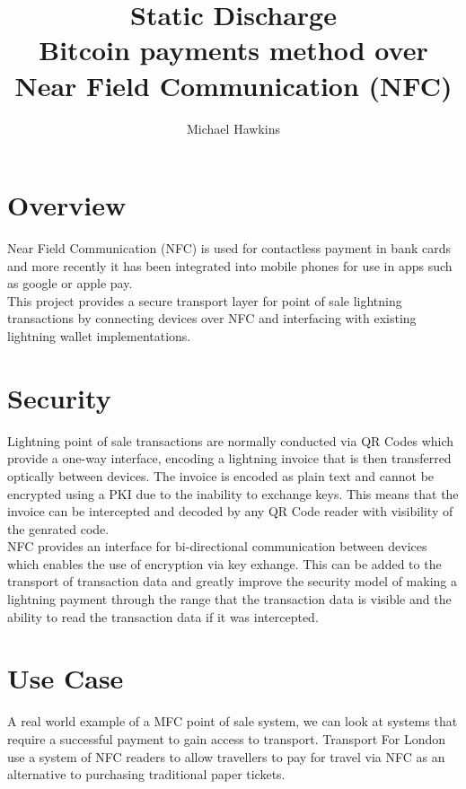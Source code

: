 \documentclass[a4paper]{article}
\begin{document}
\author{Michael Hawkins}
\title{%
	Static Discharge\\
	\large Bitcoin payments method over\\
	Near Field Communication (NFC)}

\maketitle

\section{Overview}
Near Field Communication (NFC) is used for contactless payment in bank cards and
more recently it has been integrated into mobile phones for use in apps such as
google or apple pay.\\
This project provides a secure transport layer for point of sale lightning
transactions by connecting devices over NFC and interfacing with existing
lightning wallet implementations.

\section{Security}
Lightning point of sale transactions are normally conducted via QR Codes which
provide a one-way interface, encoding a lightning invoice that is then
transferred optically between devices.  The invoice is encoded as plain text
and cannot be encrypted using a PKI due to the inability to exchange keys.  This
means that the invoice can be intercepted and decoded by any QR Code reader with
visibility of the genrated code.\\

NFC provides an interface for bi-directional communication between devices which
enables the use of encryption via key exhange.  This can be added to the
transport of transaction data and greatly improve the security model of making a
lightning payment through the range that the transaction data is visible and the
ability to read the transaction data if it was intercepted.\\

\section{Use Case}
A real world example of a MFC point of sale system, we can look at systems that
require a successful payment to gain access to transport.  Transport For London
use a system of NFC readers to allow travellers to pay for travel via NFC as an
alternative to purchasing traditional paper tickets.\\
\end{document}
